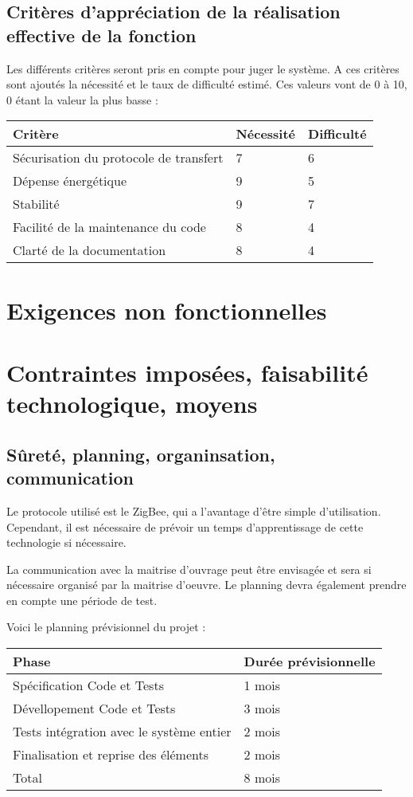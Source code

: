\subsection{Critères d'appréciation de la réalisation effective de la fonction}

Les différents critères seront pris en compte pour juger le système. A ces critères sont ajoutés la nécessité et le taux de difficulté estimé. Ces valeurs vont de 0 à 10, 0 étant la valeur la plus basse :

\begin{tabular}{|l|l|l|}
  \hline
  Critère & Nécessité & Difficulté \\
  \hline
  Sécurisation du protocole de transfert & 7 & 6 \\
  Dépense énergétique & 9 & 5 \\
  Stabilité & 9 & 7 \\
  Facilité de la maintenance du code & 8 & 4 \\
  Clarté de la documentation  & 8 & 4 \\
  \hline
\end{tabular}

\section{Exigences non fonctionnelles}

\section{Contraintes imposées, faisabilité technologique, moyens}
\subsection{Sûreté, planning, organinsation, communication}

Le protocole utilisé est le ZigBee, qui a l'avantage d'être simple d'utilisation. Cependant, il est nécessaire de prévoir un temps d'apprentissage de cette technologie si nécessaire. 

La communication avec la maitrise d'ouvrage peut être envisagée et sera si nécessaire organisé par la maitrise d'oeuvre. Le planning devra également prendre en compte une période de test.

Voici le planning prévisionnel du projet :

\begin{tabular}{|l|l|}
  \hline
  Phase & Durée prévisionnelle \\
  \hline
  Spécification Code et Tests & 1 mois \\
  Dévellopement Code et Tests & 3 mois \\
  Tests intégration avec le système entier & 2 mois \\
  Finalisation et reprise des éléments  & 2 mois \\
  \hline
  Total  & 8 mois \\
  \hline
\end{tabular}

